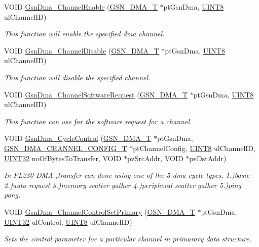 \begin{DoxyCompactItemize}
VOID \hyperlink{a00645_gafe8f53f9d44f015348fa1dc566a535a9}{GsnDma\_\-ChannelEnable} (\hyperlink{a00049}{GSN\_\-DMA\_\-T} $\ast$ptGsnDma, \hyperlink{a00660_gab27e9918b538ce9d8ca692479b375b6a}{UINT8} ulChannelID)
\begin{DoxyCompactList}\small\item\em This function will enable the specified dma channel. \end{DoxyCompactList}\item 
VOID \hyperlink{a00645_gae368b9082da7ffdcf71880d0ee0d5322}{GsnDma\_\-ChannelDisable} (\hyperlink{a00049}{GSN\_\-DMA\_\-T} $\ast$ptGsnDma, \hyperlink{a00660_gab27e9918b538ce9d8ca692479b375b6a}{UINT8} ulChannelID)
\begin{DoxyCompactList}\small\item\em This function will disable the specified channel. \end{DoxyCompactList}\item 
VOID \hyperlink{a00645_ga4b168b176e39643a79d1e17a35509ddd}{GsnDma\_\-ChannelSoftwareRequest} (\hyperlink{a00049}{GSN\_\-DMA\_\-T} $\ast$ptGsnDma, \hyperlink{a00660_gab27e9918b538ce9d8ca692479b375b6a}{UINT8} ulChannelID)
\begin{DoxyCompactList}\small\item\em This function can use for the software request for a channel. \end{DoxyCompactList}\item 
VOID \hyperlink{a00645_ga508b5fe55e9c637738cf2661a571363c}{GsnDma\_\-CycleControl} (\hyperlink{a00049}{GSN\_\-DMA\_\-T} $\ast$ptGsnDma, \hyperlink{a00052}{GSN\_\-DMA\_\-CHANNEL\_\-CONFIG\_\-T} $\ast$ptChannelConfig, \hyperlink{a00660_gab27e9918b538ce9d8ca692479b375b6a}{UINT8} ulChannelID, \hyperlink{a00660_gae1e6edbbc26d6fbc71a90190d0266018}{UINT32} noOfBytesToTransfer, VOID $\ast$pvSrcAddr, VOID $\ast$pvDstAddr)
\begin{DoxyCompactList}\small\item\em In PL230 DMA ,transfer can done using one of the 5 dma cycle types. 1.)basic 2.)auto request 3.)memory scatter gather 4.)peripheral scatter gather 5.)ping pong. \end{DoxyCompactList}\item 
VOID \hyperlink{a00645_gac94ecec6e71b0486e190f0416ac0aafe}{GsnDma\_\-ChannelControlSetPrimary} (\hyperlink{a00049}{GSN\_\-DMA\_\-T} $\ast$ptGsnDma, \hyperlink{a00660_gae1e6edbbc26d6fbc71a90190d0266018}{UINT32} ulControl, \hyperlink{a00660_gab27e9918b538ce9d8ca692479b375b6a}{UINT8} ulChannelID)
\begin{DoxyCompactList}\small\item\em Sets the control parameter for a particular channel in primarary data structure. \end{DoxyCompactList}\item 

\end{DoxyCompactItemize}
